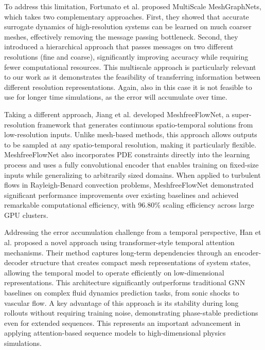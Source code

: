 To address this limitation, Fortunato et al. \cite{fortunatoMultiScaleMeshGraphNets2022} proposed MultiScale MeshGraphNets, which takes two complementary approaches. First, they showed that accurate surrogate dynamics of high-resolution systems can be learned on much coarser meshes, effectively removing the message passing bottleneck. Second, they introduced a hierarchical approach that passes messages on two different resolutions (fine and coarse), significantly improving accuracy while requiring fewer computational resources. This multiscale approach is particularly relevant to our work as it demonstrates the feasibility of transferring information between different resolution representations. Again, also in this case it is not feasible to use for longer time simulations, as the error will accumulate over time.

Taking a different approach, Jiang et al. \cite{jiangMeshfreeFlowNetPhysicsConstrainedDeep2020} developed MeshfreeFlowNet, a super-resolution framework that generates continuous spatio-temporal solutions from low-resolution inputs. Unlike mesh-based methods, this approach allows outputs to be sampled at any spatio-temporal resolution, making it particularly flexible. MeshfreeFlowNet also incorporates PDE constraints directly into the learning process and uses a fully convolutional encoder that enables training on fixed-size inputs while generalizing to arbitrarily sized domains. When applied to turbulent flows in Rayleigh-Benard convection problems, MeshfreeFlowNet demonstrated significant performance improvements over existing baselines and achieved remarkable computational efficiency, with 96.80\% scaling efficiency across large GPU clusters.

Addressing the error accumulation challenge from a temporal perspective, Han et al. \cite{hanPredictingPhysicsMeshreduced2022a} proposed a novel approach using transformer-style temporal attention mechanisms. Their method captures long-term dependencies through an encoder-decoder structure that creates compact mesh representations of system states, allowing the temporal model to operate efficiently on low-dimensional representations. This architecture significantly outperforms traditional GNN baselines on complex fluid dynamics prediction tasks, from sonic shocks to vascular flow. A key advantage of this approach is its stability during long rollouts without requiring training noise, demonstrating phase-stable predictions even for extended sequences. This represents an important advancement in applying attention-based sequence models to high-dimensional physics simulations.

